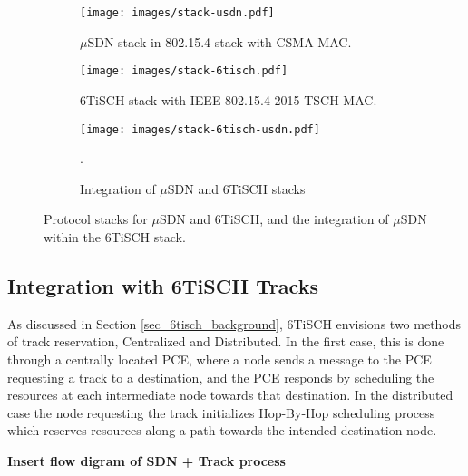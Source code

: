\begin{figure*}
\centering
  \begin{subfigure}[t]{0.65\columnwidth}
    \centering
    \texttt{[image: images/stack-usdn.pdf]}
    \caption{$\mu$SDN stack in 802.15.4 stack with CSMA MAC.}
    \label{fig:stack_usdn}
  \end{subfigure}
  \begin{subfigure}[t]{0.65\columnwidth}
  	\centering
  	\texttt{[image: images/stack-6tisch.pdf]}
  	\caption{6TiSCH stack with IEEE 802.15.4-2015 TSCH MAC.}
  	\label{fig:stack_6tisch}
  \end{subfigure}
  \begin{subfigure}[t]{0.65\columnwidth}
  	\centering
  	\texttt{[image: images/stack-6tisch-usdn.pdf]}
  	\caption{Integration of $\mu$SDN and 6TiSCH stacks}.
  	\label{fig:stack_6tisch_usdn}
  \end{subfigure}
\caption{Protocol stacks for $\mu$SDN and 6TiSCH, and the integration of $\mu$SDN within the 6TiSCH stack.}
\label{fig:stacks_all}
\end{figure*}


\subsection{Integration with 6TiSCH Tracks}

As discussed in Section \ref{sec_6tisch_background}, 6TiSCH envisions two methods of track reservation, Centralized and Distributed. In the first case, this is done through a centrally located PCE, where a node sends a message to the PCE requesting a track to a destination, and the PCE responds by scheduling the resources at each intermediate node towards that destination. In the distributed case the node requesting the track initializes Hop-By-Hop scheduling process which reserves resources along a path towards the intended destination node.



\noindent \textbf{Insert flow digram of SDN + Track process} 

